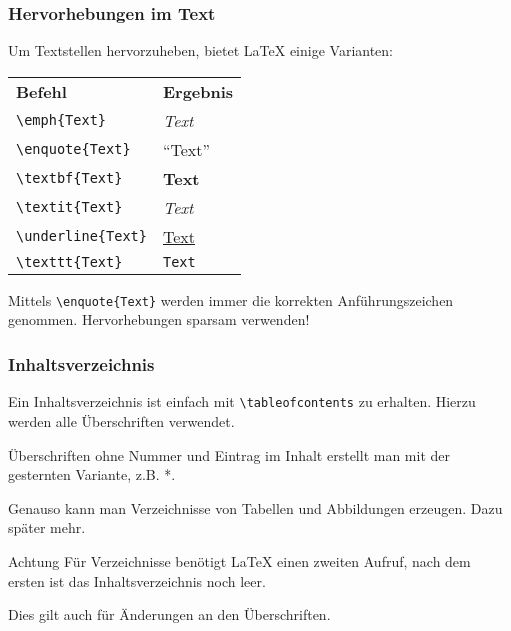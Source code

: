 \begin{frame}[fragile]
    \frametitle{Hervorhebungen im Text}
    
    Um Textstellen hervorzuheben, bietet \LaTeX{} einige Varianten:
    \medskip
    \begin{center}
        \begin{tabular}{ll}
            \textbf{Befehl} & \textbf{Ergebnis}\\
            \verb+\emph{Text}+ & \emph{Text}\\
            \verb+\enquote{Text}+ & \enquote{Text}\\
            \verb+\textbf{Text}+ & \textbf{Text}\\
            \verb+\textit{Text}+ & \textit{Text}\\
            \verb+\underline{Text}+ & \underline{Text}\\
            \verb+\texttt{Text}+ & \texttt{Text}
        \end{tabular}
    \end{center}
    \medskip
    Mittels \verb+\enquote{Text}+ werden immer die korrekten Anführungszeichen genommen. Hervorhebungen sparsam verwenden!
\end{frame}


\begin{frame}[fragile]
    \frametitle{Inhaltsverzeichnis}
    Ein Inhaltsverzeichnis ist einfach mit \verb+\tableofcontents+ zu erhalten. Hierzu werden alle Überschriften verwendet.
    \medskip    
    
    Überschriften ohne Nummer und Eintrag im Inhalt erstellt man mit der gesternten Variante, z.B. *.
    
    \medskip
    Genauso kann man Verzeichnisse von Tabellen und Abbildungen erzeugen. Dazu später mehr.
    
    \medskip
    \begin{alertblock}{Achtung}
        Für Verzeichnisse benötigt \LaTeX{} einen zweiten Aufruf, nach dem ersten ist das Inhaltsverzeichnis noch leer.
    
        \smallskip
        Dies gilt auch für Änderungen an den Überschriften.
    \end{alertblock}
\end{frame}


